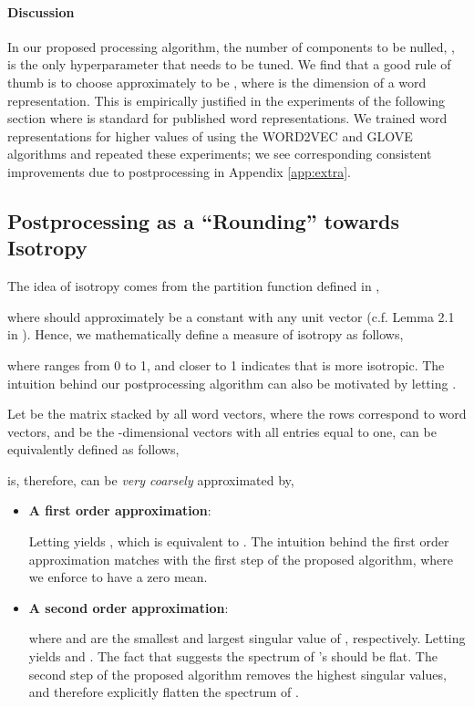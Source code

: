\documentclass{article} \usepackage{acl2017,times}
\begin{document}
\paragraph{Discussion} In our proposed processing algorithm, the number of components to be nulled,  , is the only hyperparameter that needs to be tuned. We find that a good rule of thumb is to choose  approximately to be , where  is the dimension of a word representation. This is empirically justified in the experiments of the following  section where  is standard for published word representations. We trained word representations for higher  values of  using the WORD2VEC and GLOVE algorithms and  
 repeated these experiments; we see corresponding consistent improvements due to postprocessing in   Appendix \ref{app:extra}.


{
\subsection{Postprocessing as a ``Rounding'' towards Isotropy}
\label{app:rounding}

The idea of isotropy comes from the partition function defined in \citep{arora2015rand}, 

where  should approximately be a constant with any unit vector  (c.f. Lemma 2.1 in \citep{arora2015rand}). Hence, we mathematically define a measure of isotropy as follows,

where  ranges from 0 to 1, and  closer to 1 indicates that  is more isotropic. The intuition behind our postprocessing algorithm can also be motivated by letting . 


Let  be the matrix stacked by all word vectors, where the rows correspond to word vectors, and  be the  -dimensional vectors with all entries equal to one,  can be equivalently defined as follows,

 is, therefore, can be {\em very coarsely} approximated by,
\begin{itemize}
\item {\bf A first order approximation}:

Letting  yields , which is equivalent to . The intuition behind the first order approximation matches with the first step of the proposed algorithm, where we enforce  to have a  zero mean.
\item {\bf A second order approximation}:

where  and  are the smallest and largest singular value of , respectively. Letting  yields  and . The fact that  suggests the spectrum of 's should be flat. The second step of the proposed algorithm removes the highest singular values, and therefore explicitly flatten the spectrum of . 
\end{itemize}


}
\end{document}
